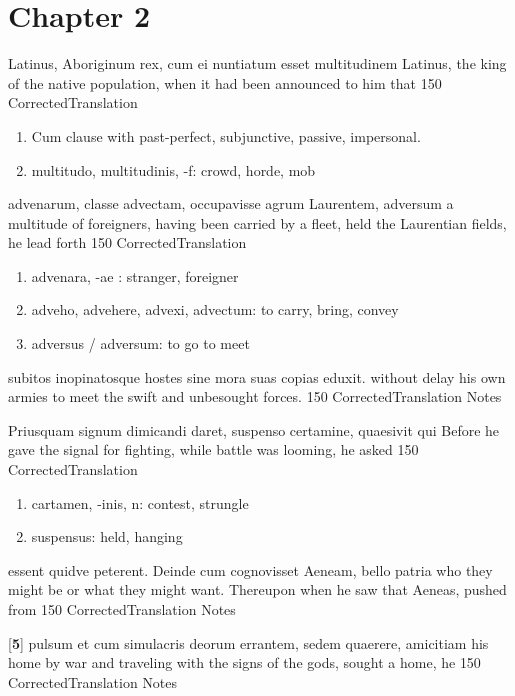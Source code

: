 \chapter*{Chapter 2} %
\label{sec:chapter_2}

\latline
  {Latinus, Aboriginum rex, cum ei nuntiatum esset multitudinem}
  { Latinus, the king of the native population, when it had been announced to him that  }
  {150}
  { CorrectedTranslation }
  { \begin{enumerate}
  	\item Cum clause with past-perfect, subjunctive, passive, impersonal.  
  	\item multitudo, multitudinis, -f:  crowd, horde, mob
  \end{enumerate} }


\latline
  {advenarum, classe advectam, occupavisse agrum Laurentem, adversum}
  { a multitude of foreigners, having been carried by a fleet, held the Laurentian fields, he lead forth}
  {150}
  { CorrectedTranslation }
  { \begin{enumerate}
  	\item advenara, -ae : stranger, foreigner
  	\item adveho, advehere, advexi, advectum:  to carry, bring, convey
  	\item adversus / adversum:  to go to meet
  \end{enumerate} }


\latline
  {subitos inopinatosque hostes sine mora suas copias eduxit.}
  { without delay his own armies to meet the swift and unbesought forces. }
  {150}
  { CorrectedTranslation }
  { Notes }


\latline
  {Priusquam signum dimicandi daret, suspenso certamine, quaesivit qui}
  { Before he gave the signal for fighting, while battle was looming, he asked }
  {150}
  { CorrectedTranslation }
  { \begin{enumerate}
  	\item cartamen, -inis, n:  contest, strungle
  	\item suspensus:  held, hanging
  \end{enumerate} }


\latline
  {essent quidve peterent.  Deinde cum cognovisset Aeneam, bello patria}
  { who they might be or what they might want.  Thereupon when he saw that Aeneas, pushed from   }
  {150}
  { CorrectedTranslation }
  { Notes }


\latline
  {[\textbf{5}] pulsum et cum simulacris deorum errantem, sedem quaerere, amicitiam}
  { his home by war and traveling with the signs of the gods, sought a home, he  }
  {150}
  { CorrectedTranslation }
  { Notes }


